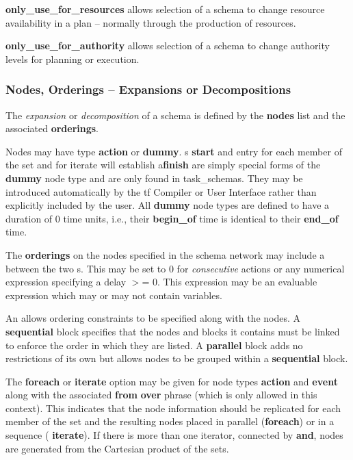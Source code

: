 {\bf only\_use\_for\_resources} allows
selection of a schema to change resource availability in a plan --
normally through the production of resources. 

{\bf only\_use\_for\_authority} allows
selection of a schema to change authority levels for planning or
execution.

\subsubsection{Nodes, Orderings -- Expansions or Decompositions}

The {\em expansion} or {\em decomposition} of a schema is defined by the {\bf
nodes} list and the associated {\bf orderings}.

Nodes may have type {\bf action} or {\bf dummy}.  s {\bf
start} and  entry for each member of the set and for iterate will establish a{\bf finish} are simply special forms of the {\bf dummy} node type
and are only found in task\_schemas. They may be introduced automatically by
the {\sc tf} Compiler or User Interface rather than explicitly included by the
user.  All {\bf dummy} node types are defined to have a duration of 0 time
units, i.e., their {\bf begin\_of} time is identical to their {\bf end\_of}
time.

The {\bf orderings} on the nodes specified in the schema network may
include a  between the two s.  This may
be set to 0 for {\em consecutive} actions or any numerical expression
specifying a delay $>$= 0.  This expression may be an evaluable
expression which may or may not contain variables. 

An  allows ordering constraints to be specified along with
the nodes.  A {\bf sequential} block specifies that the nodes and blocks
it contains must be linked to enforce the order in which they are
listed.  A {\bf parallel} block adds no restrictions of its own but allows
nodes to be grouped within a {\bf sequential} block.

\label{iteration}
The {\bf foreach} or {\bf iterate} option may be given for node types
{\bf action} and {\bf event} along with the associated {\bf from}
 {\bf over}  phrase (which is only
allowed in this context). This indicates that the node information
should be replicated for each member of the set and the resulting
nodes placed in parallel ({\bf foreach}) or in a sequence ({\bf
iterate}).  If there is more than one iterator, connected by {\bf
and}, nodes are generated from the Cartesian product of the sets.

